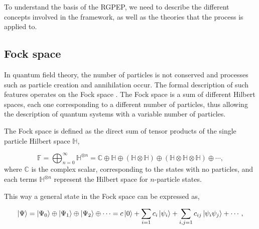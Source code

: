 \documentclass[11pt,a4paper,twoside,pdf]{article}
\numberwithin{equation}{section}
\begin{document}
To understand the basis of the RGPEP, we need to describe the different
concepts involved in the framework, as well as the theories that the process is
applied to.

\subsection{Fock space} \label{sec:fock_space}

In quantum field theory, the number of particles is not conserved 
and processes such as particle creation and annihilation occur. The formal 
description of such features operates on the Fock space 
\cite{1932ZPhy...75..622F}. The Fock space is a sum 
of different Hilbert spaces, each one corresponding to a different number of particles, 
thus allowing the description of quantum systems with a variable number of particles. 


The Fock space is defined as the direct sum of tensor products of the single 
particle Hilbert space $\mathbb{H}$,

\begin{equation}
    \mathbb{F} = \bigoplus_{n=0}^{\infty}  \mathbb{H}^{\otimes n} = 
    \mathbb{C} \oplus \mathbb{H} \oplus (\mathbb{H} \otimes \mathbb{H}) 
    \oplus (\mathbb{H} \otimes \mathbb{H}\otimes \mathbb{H}) \oplus \cdots,
\end{equation}
where $\mathbb{C}$ is the complex scalar, corresponding to the states with no particles,
and each terms \( \mathbb{H}^{\otimes n} \) represent the Hilbert space for 
\( n \)-particle states.

This way a general state in the Fock space can be expressed as,

\begin{equation}
    \ket{\Psi} = \ket{\Psi_0} \oplus \ket{\Psi_1} \oplus
    \ket{\Psi_2} \oplus \cdots = c \ket{0} + \sum_{i=1}c_i \ket{\psi_i} +
    \sum_{i,j=1}c_{ij} \ket{\psi_i \psi_j} + \cdots,
\end{equation}
\end{document}

